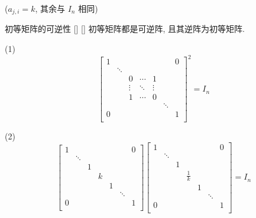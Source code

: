 \documentclass[UTF8]{ctexart}
\DeclareMathOperator{\0}{\mathbf{0}}
\DeclareMathOperator{\<}{\langle}
\renewcommand{\>}{\rangle}
\begin{document}
\begin{ppt}
			(\(a_{j,i}=k\), 其余与 \(I_n\) 相同)
		\end{ppt}
		
		\begin{ppt}
			[]
			{初等矩阵的可逆性}
			[]
			[]
			初等矩阵都是可逆阵, 且其逆阵为初等矩阵. 
		\end{ppt}
  
		\begin{prf}	
			(1)
			\[
			\begin{bmatrix}
				1 & & & & & & 0\\
				&\ddots & & & & & \\
				& & 0 & \cdots & 1 & & \\
				& &\vdots &\ddots &\vdots & & \\
				& & 1 & \cdots & 0 & & \\
				& & & & &\ddots & \\
				0 & & & & & & 1\\
			\end{bmatrix}^2=I_n
			\]
			
			(2)
			\[
			\begin{bmatrix}
				1 & & & & & & 0\\
				&\ddots & & & & & \\
				& & 1 & & & & \\
				& & & k & & & \\
				& & & & 1 & & \\
				& & & & & \ddots & \\
				0 & & & & & & 1\\
			\end{bmatrix}
			\begin{bmatrix}
				1 & & & & & & 0\\
				&\ddots & & & & & \\
				& & 1 & & & & \\
				& & & \frac{1}{k} & & & \\
				& & & & 1 & & \\
				& & & & & \ddots & \\
				0 & & & & & & 1\\
			\end{bmatrix}=I_n
			\]
			

\end{prf}
\end{document}
